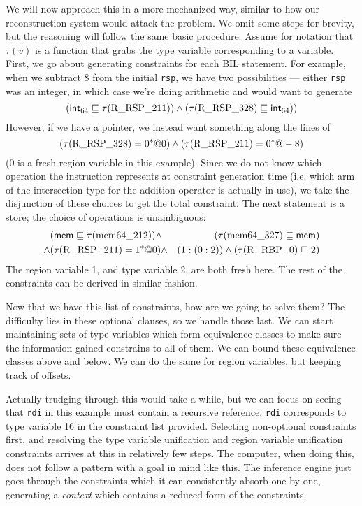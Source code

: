 We will now approach this in a more mechanized way, similar to how our reconstruction system would attack the problem. We omit some steps for brevity, but the reasoning will follow the same basic procedure. Assume for notation that $\tau(v)$ is a function that grabs the type variable corresponding to a variable. First, we go about generating constraints for each BIL statement. For example, when we subtract 8 from the initial \texttt{rsp}, we have two possibilities --- either \texttt{rsp} was an integer, in which case we're doing arithmetic and would want to generate
$$(\mathsf{int}_{64} \sqsubseteq \tau(\textrm{R\_RSP\_211})) \wedge (\tau(\textrm{R\_RSP\_328}) \sqsubseteq \mathsf{int}_{64}))$$
However, if we have a pointer, we instead want something along the lines of
$$(\tau(\textrm{R\_RSP\_328}) = 0^*@0) \wedge (\tau(\textrm{R\_RSP\_211}) = 0^*@-8)$$
(0 is a fresh region variable in this example). Since we do not know which operation the instruction represents at constraint generation time (i.e. which arm of the intersection type for the addition operator is actually in use), we take the disjunction of these choices to get the total constraint. The next statement is a store; the choice of operations is unambiguous:
\begin{align*}
& (\mathsf{mem} \sqsubseteq \tau(\textrm{mem64\_212})) \wedge& (\tau(\textrm{mem64\_327}) \sqsubseteq \mathsf{mem})\\
\wedge &(\tau(\textrm{R\_RSP\_211}) = 1^*@0) \wedge& (1 : (0 : 2)) \wedge (\tau(\textrm{R\_RBP\_0}) \sqsubseteq 2)
\end{align*}
The region variable 1, and type variable 2, are both fresh here. The rest of the constraints can be derived in similar fashion.

Now that we have this list of constraints, how are we going to solve them? The difficulty lies in these optional clauses, so we handle those last. We can start maintaining sets of type variables which form equivalence classes to make sure the information gained constrains to all of them. We can bound these equivalence classes above and below. We can do the same for region variables, but keeping track of offsets.

Actually trudging through this would take a while, but we can focus on seeing that \texttt{rdi} in this example must contain a recursive reference. \texttt{rdi} corresponds to type variable 16 in the constraint list provided. Selecting non-optional constraints first, and resolving the type variable unification and region variable unification constraints arrives at this in relatively few steps. The computer, when doing this, does not follow a pattern with a goal in mind like this. The inference engine just goes through the constraints which it can consistently absorb one by one, generating a \emph{context} which contains a reduced form of the constraints.

